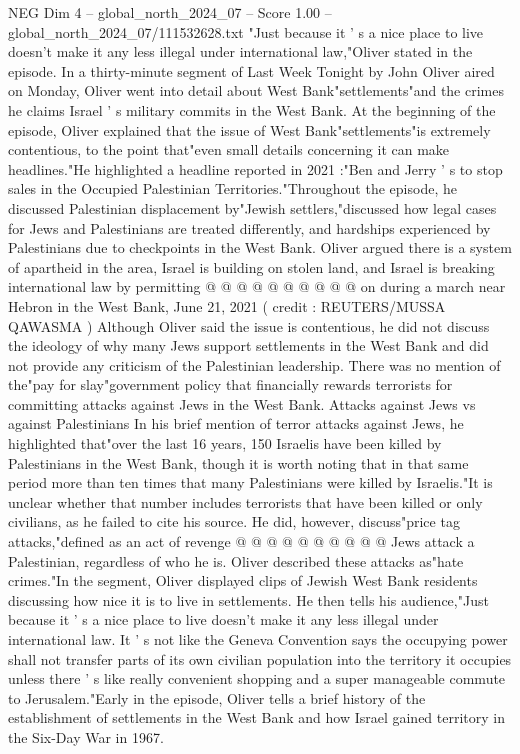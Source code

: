 \begin{textsample}{NEG Dim 4 – global\_north\_2024\_07 – Score 1.00 – global\_north\_2024\_07/111532628.txt}  \label{ex:f4_neg_284}
"Just because it ' s a nice place to live doesn't make it any less illegal under international law,"Oliver stated in the episode.
In a thirty-minute segment of Last Week Tonight by John Oliver aired on Monday, Oliver went into detail about West Bank"settlements"and the crimes he claims Israel ' s military commits in the West Bank.
At the beginning of the episode, Oliver explained that the issue of West Bank"settlements"is extremely contentious, to the point that"even small details concerning it can make headlines."He highlighted a headline reported in 2021 :"Ben and Jerry ' s to stop sales in the Occupied Palestinian Territories."Throughout the episode, he discussed Palestinian displacement by"Jewish settlers,"discussed how legal cases for Jews and Palestinians are treated differently, and hardships experienced by Palestinians due to checkpoints in the West Bank.
Oliver argued there is a system of apartheid in the area, Israel is building on stolen land, and Israel is breaking international law by permitting @ @ @ @ @ @ @ @ @ @ on during a march near Hebron in the West Bank, June 21, 2021 ( credit : REUTERS/MUSSA QAWASMA ) Although Oliver said the issue is contentious, he did not discuss the ideology of why many Jews support settlements in the West Bank and did not provide any criticism of the Palestinian leadership.
There was no mention of the"pay for slay"government policy that financially rewards terrorists for committing attacks against Jews in the West Bank.
Attacks against Jews vs against Palestinians In his brief mention of terror attacks against Jews, he highlighted that"over the last 16 years, 150 Israelis have been killed by Palestinians in the West Bank, though it is worth noting that in that same period more than ten times that many Palestinians were killed by Israelis."It is unclear whether that number includes terrorists that have been killed or only civilians, as he failed to cite his source.
He did, however, discuss"price tag attacks,"defined as an act of revenge @ @ @ @ @ @ @ @ @ @ Jews attack a Palestinian, regardless of who he is.
Oliver described these attacks as"hate crimes."In the segment, Oliver displayed clips of Jewish West Bank residents discussing how nice it is to live in settlements.
He then tells his audience,"Just because it ' s a nice place to live doesn't make it any less illegal under international law.
It ' s not like the Geneva Convention says the occupying power shall not transfer parts of its own civilian population into the territory it occupies unless there ' s like really convenient shopping and a super manageable commute to Jerusalem."Early in the episode, Oliver tells a brief history of the establishment of settlements in the West Bank and how Israel gained territory in the Six-Day War in 1967.

\end{textsample}
